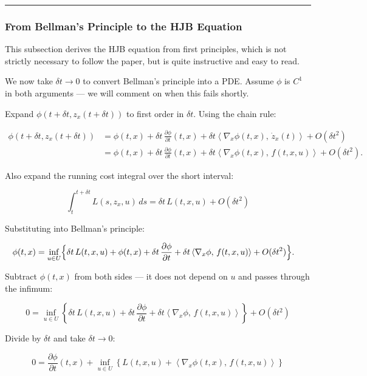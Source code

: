 \documentclass{article}
\begin{document}
\medskip\hrule\medskip

\subsubsection{From Bellman's Principle to the HJB Equation}
This subsection derives the HJB equation from first principles, which is not strictly necessary to follow the paper, but is quite instructive and easy to read.

\begin{mathrequirementsbox}
We now take $\delta t \to 0$ to convert Bellman's principle into a PDE. Assume $\phi$ is $C^1$ in both arguments — we will comment on when this fails shortly.

Expand $\phi(t + \delta t, z_x(t + \delta t))$ to first order in $\delta t$. Using the chain rule:

\begin{align*}
\phi(t + \delta t, z_x(t + \delta t))
&= \phi(t, x) + \delta t\, \frac{\partial \phi}{\partial t}(t, x) + \delta t \left\langle \nabla_x \phi(t, x),\, \dot{z}_x(t) \right\rangle + O(\delta t^2) \\
&= \phi(t, x) + \delta t\, \frac{\partial \phi}{\partial t}(t, x) + \delta t \left\langle \nabla_x \phi(t, x),\, f(t, x, u) \right\rangle + O(\delta t^2) .
\end{align*}

Also expand the running cost integral over the short interval:

$$\int_t^{t+\delta t} L(s, z_x, u)\, ds = \delta t\, L(t, x, u) + O(\delta t^2)$$

Substituting into Bellman's principle:

\begin{align*}
\phi(t, x)
&= \inf_{u \in U} \Bigl\{ \delta t\, L(t, x, u) + \phi(t, x) + \delta t\, \frac{\partial \phi}{\partial t} + \delta t \left\langle \nabla_x \phi,\, f(t, x, u) \right\rangle + O(\delta t^2) \Bigr\} .
\end{align*}

Subtract $\phi(t, x)$ from both sides — it does not depend on $u$ and passes through the infimum:

$$0 = \inf_{u \in U} \left\{ \delta t\, L(t, x, u) + \delta t\, \frac{\partial \phi}{\partial t} + \delta t \left\langle \nabla_x \phi,\, f(t, x, u) \right\rangle \right\} + O(\delta t^2)$$

Divide by $\delta t$ and take $\delta t \to 0$:

$$0 = \frac{\partial \phi}{\partial t}(t, x) + \inf_{u \in U} \left\{ L(t, x, u) + \left\langle \nabla_x \phi(t, x),\, f(t, x, u) \right\rangle \right\}$$


\end{mathrequirementsbox}
\end{document}

